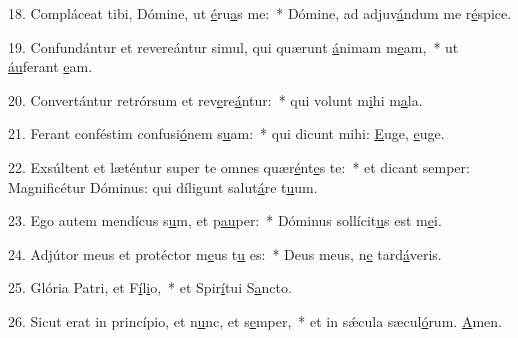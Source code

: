 18. Compláceat tibi, Dómine, ut \uline{é}ru\uline{a}s me:~* Dómine, ad adjuv\uline{á}ndum me r\uline{é}spice.\par 
19. Confundántur et revereántur simul, qui quærunt \uline{á}nimam m\uline{e}am,~* ut \uline{áu}ferant \uline{e}am.\par 
20. Convertántur retrórsum et rev\uline{e}re\uline{á}ntur:~* qui volunt m\uline{i}hi m\uline{a}la.\par 
21. Ferant conféstim confusi\uline{ó}nem s\uline{u}am:~* qui dicunt mihi: \uline{E}uge, \uline{e}uge.\par 
22. Exsúltent et læténtur super te omnes quær\uline{é}nt\uline{e}s te:~* et dicant semper: Magnificétur Dóminus: qui díligunt salut\uline{á}re t\uline{u}um.\par 
23. Ego autem mendícus s\uline{u}m, et p\uline{au}per:~* Dóminus sollícit\uline{u}s est m\uline{e}i.\par 
24. Adjútor meus et protéctor m\uline{e}us t\uline{u} es:~* Deus meus, n\uline{e} tard\uline{á}veris.\par 
25. Glória Patri, et F\uline{í}l\uline{i}o,~* et Spir\uline{í}tui S\uline{a}ncto.\par 
26. Sicut erat in princípio, et n\uline{u}nc, et s\uline{e}mper,~* et in sǽcula sæcul\uline{ó}rum. \uline{A}men.\par 
